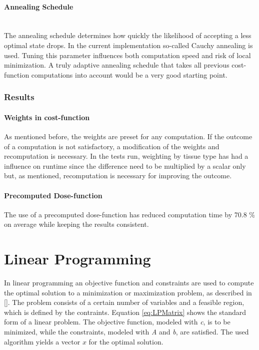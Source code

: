 \documentclass[12pt]{article}
\begin{document}
\paragraph{Annealing Schedule} ~\\ 
The annealing schedule determines how quickly the likelihood of accepting a less optimal state drops. In the current implementation so-called Cauchy annealing is used. Tuning this parameter influences both computation speed and risk of local minimization. A truly adaptive annealing schedule that takes all previous cost-function computations into account would be a very good starting point.

\subsubsection{Results}

\paragraph{Weights in cost-function}
As mentioned before, the weights are preset for any computation. If the outcome of a computation is not satisfactory, a modification of the weights and recomputation is necessary. In the tests run, weighting by tissue type has had a influence on runtime since the difference need to be multiplied by a scalar only but, as mentioned, recomputation is necessary for improving the outcome. \\ 

\paragraph{Precomputed Dose-function} 
The use of a precomputed dose-function has reduced computation time by 70.8 \%  on average while keeping the results consistent.

\section{Linear Programming}
In linear programming an objective function and constraints are used to compute the optimal solution to a minimization or maximization problem, as described in [\cite{matprog}]. The problem consists of a certain number of variables and a feasible region, which is defined by the contraints. 
Equation \eqref{eq:LPMatrix} shows the standard form of a linear problem. The objective function, modeled with \textit{c},  is to be minimized, while the constraints, modeled with \textit{A} and \textit{b}, are satisfied. The used algorithm yields a vector $x$ for the optimal solution.
\end{document}
